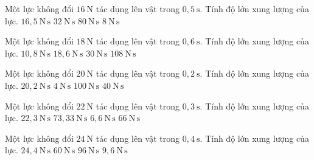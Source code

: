 \begin{ex}
Một lực không đổi $16\ \mathrm{N}$ tác dụng lên vật trong $0,5\ \mathrm{s}$. Tính độ lớn xung lượng của lực.
\choice
{$16,5\ \mathrm{N\,s}$}
{$32\ \mathrm{N\,s}$}
{$80\ \mathrm{N\,s}$}
{\True $8\ \mathrm{N\,s}$}
\end{ex}

\begin{ex}
Một lực không đổi $18\ \mathrm{N}$ tác dụng lên vật trong $0,6\ \mathrm{s}$. Tính độ lớn xung lượng của lực.
\choice
{\True $10,8\ \mathrm{N\,s}$}
{$18,6\ \mathrm{N\,s}$}
{$30\ \mathrm{N\,s}$}
{$108\ \mathrm{N\,s}$}
\end{ex}

\begin{ex}
Một lực không đổi $20\ \mathrm{N}$ tác dụng lên vật trong $0,2\ \mathrm{s}$. Tính độ lớn xung lượng của lực.
\choice
{$20,2\ \mathrm{N\,s}$}
{\True $4\ \mathrm{N\,s}$}
{$100\ \mathrm{N\,s}$}
{$40\ \mathrm{N\,s}$}
\end{ex}

\begin{ex}
Một lực không đổi $22\ \mathrm{N}$ tác dụng lên vật trong $0,3\ \mathrm{s}$. Tính độ lớn xung lượng của lực.
\choice
{$22,3\ \mathrm{N\,s}$}
{$73,33\ \mathrm{N\,s}$}
{\True $6,6\ \mathrm{N\,s}$}
{$66\ \mathrm{N\,s}$}
\end{ex}

\begin{ex}
Một lực không đổi $24\ \mathrm{N}$ tác dụng lên vật trong $0,4\ \mathrm{s}$. Tính độ lớn xung lượng của lực.
\choice
{$24,4\ \mathrm{N\,s}$}
{$60\ \mathrm{N\,s}$}
{$96\ \mathrm{N\,s}$}
{\True $9,6\ \mathrm{N\,s}$}
\end{ex}


